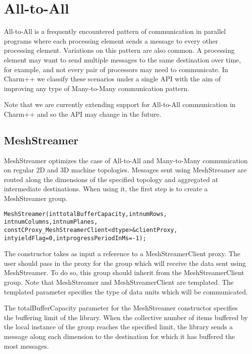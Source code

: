 \section{All-to-All}
All-to-All is a frequently encountered pattern of communication in
parallel programs where each processing element sends a message to
every other processing element. Variations on this pattern are also
common. A processing element may want to send multiple messages to the
same destination over time, for example, and not every pair of
processors may need to communicate. In Charm++ we classify these
scenarios under a single API with the aim of improving any type of
Many-to-Many communication pattern.

Note that we are currently extending support for All-to-All
communication in Charm++ and so the API may change in the
future. 

\subsection{MeshStreamer}

MeshStreamer optimizes the case of All-to-All and Many-to-Many
communication on regular 2D and 3D machine topologies. Messages sent
using MeshStreamer are routed along the dimensions of the specified
topology and aggregated at intermediate destinations. When using it,
the first step is to create a MeshStreamer group. 

\begin{alltt}
MeshStreamer(int totalBufferCapacity, int numRows, 
             int numColumns, int numPlanes, 
             const CProxy_MeshStreamerClient<dtype> &clientProxy,
             int yieldFlag = 0, int progressPeriodInMs = -1);
\end{alltt}

The constructor takes as input a reference to a MeshStreamerClient
proxy. The user should pass in the proxy for the group which will
receive the data sent using MeshStreamer. To do so, this group should
inherit from the MeshStreamerClient group. Note that MeshStreamer and
MeshStreamerClient are templated. The templated parameter specifies
the type of data units which will be communicated. 

The totalBufferCapacity parameter for the MeshStreamer constructor
specifies the buffering limit of the library. When the collective
number of items buffered by the local instance of the group reaches
the specified limit, the library sends a message along each dimension
to the destination for which it has buffered the most messages.

